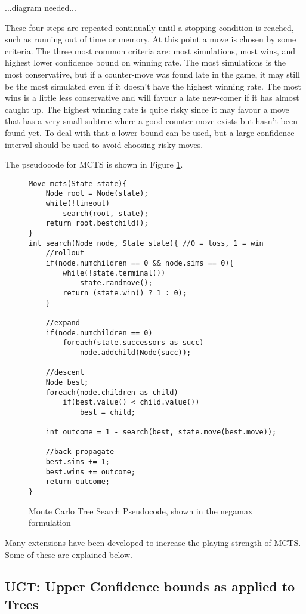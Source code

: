 ...diagram needed...

These four steps are repeated continually until a stopping condition is reached, such as running out of time or memory. At this point a move is chosen by some criteria. The three most common criteria are: most simulations, most wins, and highest lower confidence bound on winning rate. The most simulations is the most conservative, but if a counter-move was found late in the game, it may still be the most simulated even if it doesn't have the highest winning rate. The most wins is a little less conservative and will favour a late new-comer if it has almost caught up. The highest winning rate is quite risky since it may favour a move that has a very small subtree where a good counter move exists but hasn't been found yet. To deal with that a lower bound can be used, but a large confidence interval should be used to avoid choosing risky moves.

The pseudocode for MCTS is shown in Figure \ref{fig:mctscode}.

\begin{figure}

\begin{lstlisting}
Move mcts(State state){
	Node root = Node(state);
	while(!timeout)
		search(root, state);
	return root.bestchild();
}
int search(Node node, State state){ //0 = loss, 1 = win
	//rollout
	if(node.numchildren == 0 && node.sims == 0){
		while(!state.terminal())
			state.randmove();
		return (state.win() ? 1 : 0);
	}

	//expand
	if(node.numchildren == 0)
		foreach(state.successors as succ)
			node.addchild(Node(succ));

	//descent
	Node best;
	foreach(node.children as child)
		if(best.value() < child.value())
			best = child;

	int outcome = 1 - search(best, state.move(best.move));

	//back-propagate
	best.sims += 1;
	best.wins += outcome;
	return outcome;
}
\end{lstlisting}

\caption{Monte Carlo Tree Search Pseudocode, shown in the negamax formulation}
\label{fig:mctscode}
\end{figure}


Many extensions have been developed to increase the playing strength of MCTS. Some of these are explained below.

\subsection{UCT: Upper Confidence bounds as applied to Trees}


